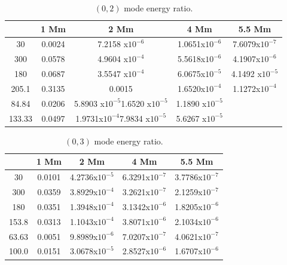 \documentclass[preprint,authoryear,12pt]{elsarticle}
\begin{document}
\begin{table}[h]
\centering
\begin{tabular}{c c c c c }
\hline
   &  1 Mm & 2 Mm & 4 Mm & 5.5 Mm \\
\hline
30 &  0.0024 & 7.2158 x$10^{-6}$ & 1.0651x$10^{-6}$ & 7.6079x$10^{-7}$\\
\hline
300 & 0.0578 & 4.9604 x$10^{-4}$ & 5.5618x$10^{-6}$ & 4.1907x$10^{-6}$\\
\hline
180 & 0.0687 & 3.5547 x$10^{-4}$ & 6.0675x$10^{-5}$ & 4.1492 x$10^{-5}$\\
\hline
205.1 & 0.3135 & 0.0015 &1.6520x$10^{-4}$ & 1.1272x$10^{-4}$\\
\hline
84.84 & 0.0206 &5.8903 x$10^{-5}$1.6520 x$10^{-5}$ & 1.1890 x$10^{-5}$\\
\hline
133.33 & 0.0497 & 1.9731x$10^{-4}$7.9834 x$10^{-5}$ & 5.6267 x$10^{-5}$\\
\hline
\end{tabular} 
\caption{ $(0, 2)$ mode energy ratio.}
\label{Table02mode}
\end{table}

\begin{table}[h]
\centering
\begin{tabular}{c c c c c }
\hline
   &  1 Mm & 2 Mm & 4 Mm & 5.5 Mm \\
\hline
30 &  0.0101 &  4.2736x$10^{-5}$ & 6.3291x$10^{-7}$ & 3.7786x$10^{-7}$\\
\hline
300 & 0.0359 & 3.8929x$10^{-4}$ & 3.2621x$10^{-7}$ & 2.1259x$10^{-7}$\\
\hline
180 & 0.0351 &1.3948x$10^{-4}$ & 3.1342x$10^{-6}$ & 1.8205x$10^{-6}$\\
\hline
153.8 & 0.0313 & 1.1043x$10^{-4}$ & 3.8071x$10^{-6}$ & 2.1034x$10^{-6}$\\
\hline
63.63 & 0.0051 & 9.8989x$10^{-6}$ & 7.0207x$10^{-7}$ & 4.0621x$10^{-7}$\\
\hline
100.0 & 0.0151 & 3.0678x$10^{-5}$ & 2.8527x$10^{-6}$ & 1.6707x$10^{-6}$\\
\hline
\end{tabular} 
\caption{$(0, 3)$ mode energy ratio.}
\label{Table03mode}
\end{table}
\end{document}
